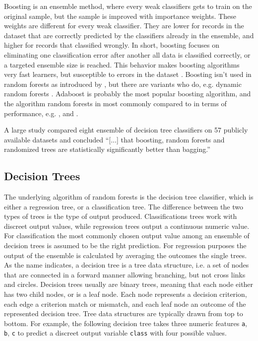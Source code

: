 \documentclass[a4paper,man,12pt,apacite]{apa6} %
\begin{document}
Boosting is an ensemble method, where every weak classifiers gets to train
on the original sample, but the sample is improved with importance weights.
These weights are different for every weak classifier.
They are lower for records in the dataset that are correctly predicted by
the classifiers already in the ensemble,
and higher for records that classified wrongly.
In short, boosting focuses on eliminating one classification error after
another all data is classified correctly,
or a targeted ensemble size is reached.
This behavior makes boosting algorithms very fast learners,
but susceptible to errors in the dataset \cite{long2010random}.
Boosting isn't used in random forests as introduced by \cite{breiman2001random},
but there are variants who do, e.g.
dynamic random forests \cite{bernard2012dynamic}.
Adaboost \cite{freund1995decision} is probably the most popular
boosting algorithm, and the algorithm random forests in most commonly
compared to in terms of performance, e.g. \cite{breiman2001random},
\cite{banfield2007comparison} and \cite{rodriguez2006rotation}.

A large study \cite{banfield2007comparison} compared eight ensemble of
decision tree classifiers on 57 publicly available datasets and concluded
“[...] that boosting, random forests and randomized trees are
statistically significantly better than bagging.”

\subsection{Decision Trees}

The underlying algorithm of random forests is the decision tree classifier,
which is either a regression tree, or a classification tree.
The difference between the two types of trees is the type of output produced.
Classifications trees work with discreet output values,
while regression trees output a continuous numeric value.
For classification the most commonly chosen output value among an ensemble
of decision trees is assumed to be the right prediction.
For regression purposes the output of the ensemble is calculated by averaging
the outcomes the single trees.
As the name indicates, a decision tree is a tree data structure, i.e.
a set of nodes that are connected in a forward manner allowing branching,
but not cross links and circles.
Decision trees usually are binary trees, meaning that each node either has
two child nodes, or is a leaf node.
Each node represents a decision criterion, each edge a criterion match or
mismatch, and each leaf node an outcome of the represented decision tree.
Tree data structures are typically drawn from top to bottom.
For example, the following decision tree takes three numeric features
\texttt{a}, \texttt{b}, \texttt{c} to predict a discreet output variable
\texttt{class} with four possible values.
\end{document}
